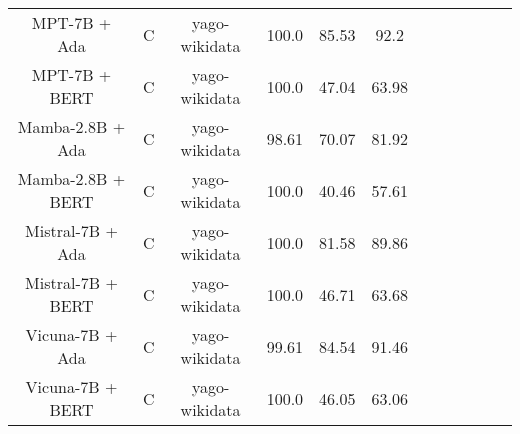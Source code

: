\begin{table}
\begin{tabular}{|c|c|c|c|c|c|c|c|c|c|c|c|}
	MPT-7B + Ada  & C & yago-wikidata  &  100.0 &  85.53 & 92.2  \\
	MPT-7B + BERT  & C & yago-wikidata  &  100.0 &  47.04 & 63.98  \\
	Mamba-2.8B + Ada  & C & yago-wikidata  &  98.61 &  70.07 & 81.92  \\
	Mamba-2.8B + BERT  & C & yago-wikidata  &  100.0 &  40.46 & 57.61  \\
	Mistral-7B + Ada  & C & yago-wikidata  &  100.0 &  81.58 & 89.86  \\
	Mistral-7B + BERT  & C & yago-wikidata  &  100.0 &  46.71 & 63.68  \\
	Vicuna-7B + Ada  & C & yago-wikidata  &  99.61 &  84.54 & 91.46  \\
	Vicuna-7B + BERT  & C & yago-wikidata  &  100.0 &  46.05 & 63.06  \\
	\hline
\end{tabular}
    \end{table}









